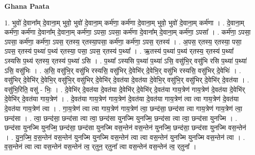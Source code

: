 \documentclass[17pt]{extarticle}
\begin{document}
\textbf{Ghana Paata } \newline

1. भुवो॑ दे॒वाना᳚म् दे॒वाना॒म् भुवो॒ भुवो॑ दे॒वाना॒म् कर्म॑णा॒ कर्म॑णा दे॒वाना॒म् भुवो॒ भुवो॑ दे॒वाना॒म् कर्म॑णा । . दे॒वाना॒म् कर्म॑णा॒ कर्म॑णा दे॒वाना᳚म् दे॒वाना॒म् कर्म॑णा॒ ऽपसा॒ ऽपसा॒ कर्म॑णा दे॒वाना᳚म् दे॒वाना॒म् कर्म॑णा॒ ऽपसा᳚ । . कर्म॑णा॒ ऽपसा॒ ऽपसा॒ कर्म॑णा॒ कर्म॑णा॒ ऽपस॒ र्‌तस्य॒ र्‌तस्या॒पसा॒ कर्म॑णा॒ कर्म॑णा॒ ऽपस॒ र्‌तस्य॑ । . अ॒पस॒ र्‌तस्य॒ र्‌तस्या॒ पसा॒ ऽपस॒ र्‌तस्य॑ प॒थ्या॑ प॒थ्य॑ र्‌तस्या॒ पसा॒ ऽपस॒ र्‌तस्य॑ प॒थ्या᳚ । . ऋ॒तस्य॑ प॒थ्या॑ प॒थ्य॑ र्‌तस्य॒ र्‌तस्य॑ प॒थ्या᳚ ऽस्यसि प॒थ्य॑ र्‌तस्य॒ र्‌तस्य॑ प॒थ्या॑ ऽसि । . प॒थ्या᳚ ऽस्यसि प॒थ्या॑ प॒थ्या॑ ऽसि॒ वसु॑भि॒र् वसु॑भि रसि प॒थ्या॑ प॒थ्या॑ ऽसि॒ वसु॑भिः । . अ॒सि॒ वसु॑भि॒र् वसु॑भि रस्यसि॒ वसु॑भिर् दे॒वेभि॑र् दे॒वेभि॒र् वसु॑भि रस्यसि॒ वसु॑भिर् दे॒वेभिः॑ । . वसु॑भिर् दे॒वेभि॑र् दे॒वेभि॒र् वसु॑भि॒र् वसु॑भिर् दे॒वेभि॑र् दे॒वत॑या दे॒वत॑या दे॒वेभि॒र् वसु॑भि॒र् वसु॑भिर् दे॒वेभि॑र् दे॒वत॑या । . वसु॑भि॒रिति॒ वसु॑ - भिः॒ । . दे॒वेभि॑र् दे॒वत॑या दे॒वत॑या दे॒वेभि॑र् दे॒वेभि॑र् दे॒वत॑या गाय॒त्रेण॑ गाय॒त्रेण॑ दे॒वत॑या दे॒वेभि॑र् दे॒वेभि॑र् दे॒वत॑या गाय॒त्रेण॑ । . दे॒वत॑या गाय॒त्रेण॑ गाय॒त्रेण॑ दे॒वत॑या दे॒वत॑या गाय॒त्रेण॑ त्वा त्वा गाय॒त्रेण॑ दे॒वत॑या दे॒वत॑या गाय॒त्रेण॑ त्वा । . गा॒य॒त्रेण॑ त्वा त्वा गाय॒त्रेण॑ गाय॒त्रेण॑ त्वा॒ छन्द॑सा॒ छन्द॑सा त्वा गाय॒त्रेण॑ गाय॒त्रेण॑ त्वा॒ छन्द॑सा । . त्वा॒ छन्द॑सा॒ छन्द॑सा त्वा त्वा॒ छन्द॑सा युनज्मि युनज्मि॒ छन्द॑सा त्वा त्वा॒ छन्द॑सा युनज्मि । . छन्द॑सा युनज्मि युनज्मि॒ छन्द॑सा॒ छन्द॑सा युनज्मि वस॒न्तेन॑ वस॒न्तेन॑ युनज्मि॒ छन्द॑सा॒ छन्द॑सा युनज्मि वस॒न्तेन॑ । . यु॒न॒ज्मि॒ व॒स॒न्तेन॑ वस॒न्तेन॑ युनज्मि युनज्मि वस॒न्तेन॑ त्वा त्वा वस॒न्तेन॑ युनज्मि युनज्मि वस॒न्तेन॑ त्वा । . व॒स॒न्तेन॑ त्वा त्वा वस॒न्तेन॑ वस॒न्तेन॑ त्व॒ र्‌तुन॒ र्‌तुना᳚ त्वा वस॒न्तेन॑ वस॒न्तेन॑ त्व॒ र्‌तुना᳚ । \newline
\end{document}
